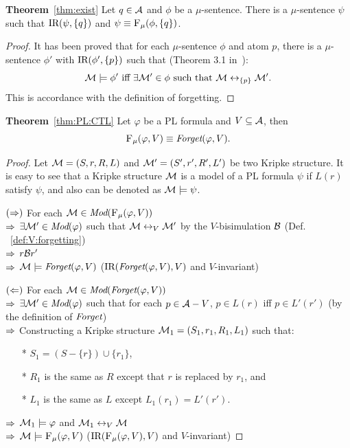 \documentclass[runningheads]{llncs}
\begin{document}
\noindent\textbf{Theorem}~\ref{thm:exist}
Let $q \in \cal A$ and $\phi$ be a $\mu$-sentence. There is a $\mu$-sentence $\psi$ such that $\textrm{IR}(\psi, \{q\})$ and $\psi \equiv {\textsc{F}_{\textsc{$\mu$}}}(\phi, \{q\})$.
\begin{proof}
It has been proved that for each $\mu$-sentence $\phi$ and atom $p$, there is a $\mu$-sentence $\phi'$ with $\textrm{IR}(\phi', \{p\})$ such that (Theorem 3.1 in~\cite{d1996uniform}):
\[
    {\cal M} \models \phi' \mbox{ iff } \exists {\cal M}' \in \phi \mbox{ such that } {\cal M} \leftrightarrow_{\{p\}} {\cal M}'.
\]
This is accordance with the definition of forgetting.
\end{proof}


\noindent\textbf{Theorem}~\ref{thm:PL:CTL}
Let $\varphi$ be a PL formula and $V\subseteq {\cal A}$, then
\[
{\textsc{F}_{\textsc{$\mu$}}}(\varphi, V) \equiv \textit{Forget}(\varphi, V).
\]
\begin{proof}
Let ${\cal M} = (S, r, R, L)$ and ${\cal M}' = (S', r', R', L')$ be two Kripke structure.
It is easy to see that a Kripke structure ${\cal M}$ is a model of a PL formula $\psi$ if $L(r)$ satisfy $\psi$, and also can be denoted as ${\cal M} \models \psi$.

$(\Rightarrow)$ For each ${\cal M} \in \textit{Mod}({\textsc{F}_{\textsc{$\mu$}}}(\varphi, V))$ \\
$\Rightarrow$ $\exists {\cal M}' \in \textit{Mod}(\varphi)$ such that ${\cal M} \leftrightarrow_V {\cal M}'$ by the $V$-bisimulation ${\cal B}$ \hfill(Def. ~\ref{def:V:forgetting})\\
$\Rightarrow$ $r {\cal B} r'$ \\
$\Rightarrow$ ${\cal M} \models \textit{Forget}(\varphi, V)$  \hfill ($\textrm{IR}(\textit{Forget}(\varphi, V),V)$ and $V$-invariant)

$(\Leftarrow)$ For each ${\cal M} \in \textit{Mod}(\textit{Forget}(\varphi, V))$ \\
$\Rightarrow$ $\exists {\cal M}' \in\textit{Mod}(\varphi)$ such that for each $p \in {\cal A}-V$, $p \in L(r)$ iff $p \in L'(r')$ \hfill (by the definition of $\textit{Forget}$)\\
$\Rightarrow$ Constructing a Kripke structure ${\cal M}_1 = (S_1, r_1, R_1, L_1)$ such that:
\begin{itemize}
    \item [*] $S_1 = (S - \{r\}) \cup \{r_1\}$,
    \item [*] $R_1$ is the same as $R$ except that $r$ is replaced by $r_1$, and
    \item [*] $L_1$ is the same as $L$ except $L_1(r_1) = L'(r')$.
\end{itemize}
$\Rightarrow$ ${\cal M}_1 \models \varphi$ and ${\cal M}_1 \leftrightarrow_V {\cal M}$\\
$\Rightarrow$ ${\cal M} \models {\textsc{F}_{\textsc{$\mu$}}}(\varphi, V)$ \hfill ($\textrm{IR}({\textsc{F}_{\textsc{$\mu$}}}(\varphi, V), V)$ and $V$-invariant)
\end{proof}
\end{document}
